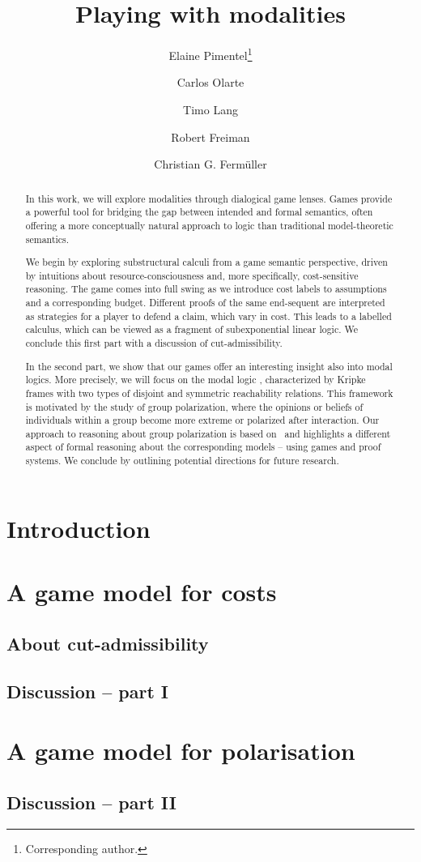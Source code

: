 \documentclass[a4paper,UKenglish,cleveref, autoref, thm-restate]{lipics-v2021}
\title{Playing with modalities}
\author{Elaine Pimentel\footnote{Corresponding author.}}{Computer Science Department UCL, UK \and \url{https://sites.google.com/site/elainepimentel/} }{e.pimentel@ucl.ac.uk}{https://orcid.org/0000-0002-7113-0801}{Pimentel has received funding from the European Union's Horizon 2020 research and innovation programme under the Marie Sk\l odowska-Curie grant agreement Number 101007627 and by the Leverhulme Project ECUMENICAL.}
\author{Carlos Olarte}{LIPN, CNRS UMR 7030, Universit\'{e} Sorbonne Paris Nord, France \and \url{https://sites.google.com/site/carlosolarte/} }{olarte@lipn.univ-paris13.fr}{https://orcid.org/0000-0002-7264-7773}{The work of Olarte has been partially supported by the SGR project PROMUEVA (BPIN
2021000100160) under the supervision of Minciencias (Ministerio de Ciencia Tecnolog\'ia e Innovaci\'on, Colombia). Olarte acknowledges also support from the NATO
Science for Peace
and Security Programme through grant number G6133 (project SymSafe). }
\author{Timo Lang}{Computer Science Department UCL, UK \and \url{https://www.timolang.com/}}{timo.lang@ucl.ac.uk}{0000-0002-8257-968X}{}
\author{Robert Freiman}{TU-Wien, Austria}{robert@logic.at}{0000-0001-8251-4272}{}
\author{Christian G. Ferm\"{u}ller}{TU-Wien, Austria \and \url{https://www.logic.at/staff/chrisf/home.html}}{chrisf@logic.at}{0000-0003-2932-5477}{}
\begin{document}
\maketitle

\begin{abstract}
In this work, we will explore modalities through dialogical game lenses. Games provide a powerful tool for bridging the gap between intended and formal semantics, often offering a more conceptually natural approach to logic than traditional model-theoretic semantics.

We begin by exploring substructural calculi  from a game semantic perspective, driven by intuitions about resource-consciousness and, more specifically, cost-sensitive reasoning. The game comes into full swing as we introduce cost labels to assumptions and a corresponding budget. Different proofs of the same end-sequent are interpreted as strategies for a player to defend a claim, which vary in cost. This leads to a labelled calculus, which can be viewed as a fragment of subexponential linear logic. 
%
We conclude this first part with a discussion of cut-admissibility.

In the second part, we show that our games offer an interesting insight also into modal logics. More precisely, we will focus on the modal logic \PNL, characterized by Kripke frames with two types of disjoint and symmetric reachability relations. This framework is motivated by the study of group polarization, where the opinions or beliefs of individuals within a group become more extreme or polarized after interaction. Our approach to reasoning about group polarization is based on \PNL\ and highlights a different aspect of formal reasoning about the corresponding models -- using games and proof systems.
%
We conclude by outlining potential directions for future research.

\end{abstract}

\section{Introduction}\label{sec:intro}


\section{A game model for costs}\label{sec:sell}

\subsection{About cut-admissibility}\label{subsec:cut}

\subsection{Discussion -- part I}\label{subsec:conc1}

\section{A game model for polarisation}

\subsection{Discussion -- part II}\label{subsec:conc2}


\end{document}
